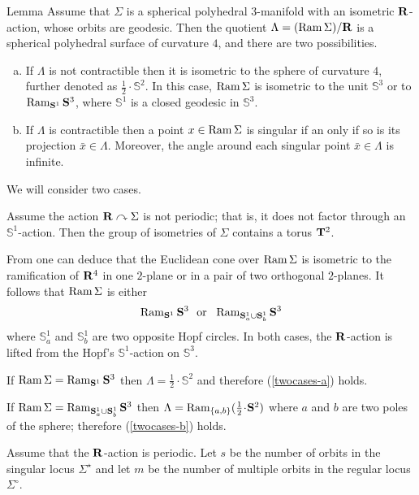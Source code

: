 \documentclass{compositio}
\begin{document}
\begin{thm}{Lemma}\label{twocases}
Assume that $\Sigma$ is a spherical polyhedral $3$-manifold
with an isometric $\mathbf{R}$-action, whose orbits are geodesic.
Then the quotient $\Lambda=(\mathop{\rm Ram}\nolimits\Sigma)/\mathbf{R}$ is a spherical polyhedral surface
of curvature $4$, and there are two possibilities.
\begin{enumerate}[(a)]
\item\label{twocases-a}
If $\Lambda$ is not contractible then it is isometric to the sphere of curvature $4$, further denoted as $\tfrac12\cdot\mathbb{S}^2$.
In this case, $\mathop{\rm Ram}\nolimits \Sigma$ is isometric to the unit $\mathbb{S}^3$ or to $\mathop{\rm Ram}\nolimits_{\mathbf{S}^1}\mathbf{S}^3$, where  $\mathbb{S}^1$ is a closed geodesic in $\mathbb{S}^3$.
\item\label{twocases-b} If $\Lambda$ is contractible
then a point $x\in \mathop{\rm Ram}\nolimits \Sigma$ is singular
if an only if so is its projection $\bar x\in \Lambda$.
Moreover, the angle around each singular point $\bar x\in \Lambda$
is infinite.
\end{enumerate}
\end{thm}

We will consider two cases.

 Assume the action $\mathbf{R}\curvearrowright\Sigma$ is not periodic;
that is, it does not factor through an $\mathbb{S}^1$-action.
Then the group of isometries of $\Sigma$ contains a torus $\mathbf{T}^2$.


From \cite[Proposition 3.9]{panov} one can deduce that the Euclidean
cone over $\mathop{\rm Ram}\nolimits\Sigma$ is isometric to the ramification of $\mathbf{R}^4$
in one $2$-plane or in a pair of two orthogonal $2$-planes.
It follows that $\mathop{\rm Ram}\nolimits \Sigma$ is either
$$\Ram_{\mathbb{S}^1}\mathbb{S}^3 \ \ \mathrm{or}\ \ \Ram_{\mathbb{S}_a^1\cup \mathbb{S}_b^1}\mathbb{S}^3$$
where $\mathbb{S}_a^1$ and $\mathbb{S}_b^1$ are two opposite Hopf circles.
In both cases, the $\mathbf{R}$-action is lifted from the Hopf's $\mathbb{S}^1$-action on $\mathbb{S}^3$.

If $\mathop{\rm Ram}\nolimits \Sigma=\mathop{\rm Ram}\nolimits_{\mathbf{S}^1}\mathbf{S}^3$ then
$\Lambda=\tfrac12\cdot\mathbb{S}^2$ and therefore (\ref{twocases-a}) holds.

If $\mathop{\rm Ram}\nolimits \Sigma=\mathop{\rm Ram}\nolimits_{\mathbf{S}_a^1\cup \mathbf{S}_b^1}\mathbf{S}^3$ then  $\Lambda=\Ram_{\{a,b\}}(\tfrac12\cdot\mathbb{S}^2)$ where $a$ and $b$ are two poles of the sphere;
therefore (\ref{twocases-b}) holds.

 Assume that the $\mathbf{R}$-action is periodic.
Let $s$ be the number of orbits in the singular locus $\Sigma^{{\star}}$
and let $m$ be the number of multiple orbits in the regular locus $\Sigma^\circ$.
\end{document}
